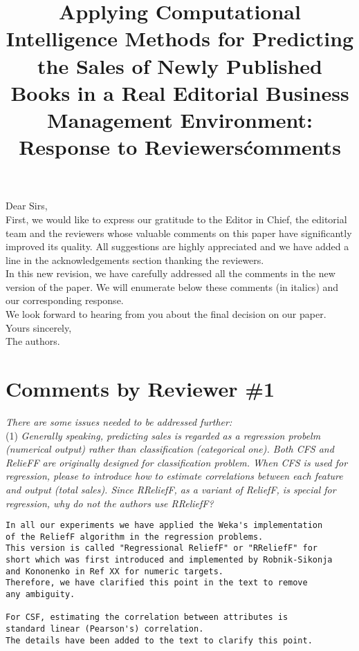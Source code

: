 \documentclass[preprint]{elsarticle}
\begin{document}

\title{Applying Computational Intelligence Methods for Predicting the Sales of Newly Published Books in a Real Editorial Business Management Environment: Response to Reviewers\' comments}

\noindent
Dear Sirs,\\

First, we would like to express our gratitude to the Editor in Chief,
the editorial team and the reviewers whose valuable comments on this
paper have significantly improved its quality. All suggestions are
highly appreciated and we have added a line in the acknowledgements
section thanking the reviewers. \\ 

In this new revision, we have carefully addressed all the comments in
the new version of the paper. We will enumerate below these comments
(in italics) and our corresponding response. \\ 

We look forward to hearing from you about the final decision on our paper. \\

\noindent
Yours sincerely,\\
The authors.


\section{Comments by Reviewer \#1}

\noindent \emph{There are some issues needed to be addressed further:} \\

\noindent (1) \emph{Generally speaking, predicting sales is regarded as a regression probelm (numerical output) rather than classification (categorical one). Both CFS and RelieFF are originally designed for classification problem. When CFS is used for regression, please to introduce how to estimate correlations between each feature and output (total sales). Since RReliefF, as a variant of ReliefF, is special for regression, why do not the authors use RReliefF? } 

\begin{verbatim}
In all our experiments we have applied the Weka's implementation 
of the ReliefF algorithm in the regression problems. 
This version is called "Regressional ReliefF" or "RReliefF" for 
short which was first introduced and implemented by Robnik-Sikonja 
and Kononenko in Ref XX for numeric targets. 
Therefore, we have clarified this point in the text to remove 
any ambiguity.

For CSF, estimating the correlation between attributes is 
standard linear (Pearson's) correlation.
The details have been added to the text to clarify this point.
\end{verbatim}
\end{document}
